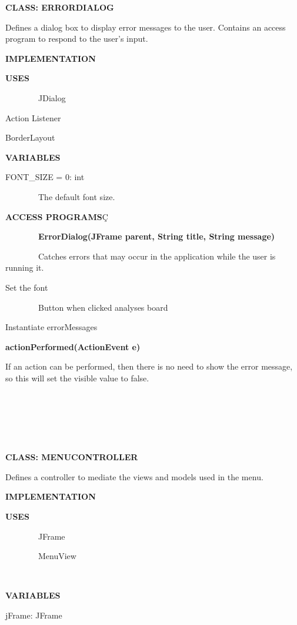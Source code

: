 \documentclass{article}
\begin{document}
{{}

{\textbf{CLASS: ERRORDIALOG }}

{Defines a dialog box to display error messages to the user. Contains an
access program to respond to the user's input.}

{}

{\textbf{IMPLEMENTATION}}

{\textbf{USES}}

{~~~~~~~~JDialog}

{Action Listener}

{BorderLayout}

{\textbf{VARIABLES}}

{FONT\_SIZE = 0: int}

{~~~~~~~~The default font size.}

{}

{\textbf{ACCESS PROGRAMS}Ç

{~~~~~~~~\textbf{ErrorDialog(JFrame parent, String title, String message)}}

{~~~~~~~~Catches errors that may occur in the application while the user
is running it. ~~~~~~~~}

{Set the font}

{~~~~~~~~Button when clicked analyses board}

{Instantiate errorMessages}

{}

{\textbf{actionPerformed(ActionEvent e)}}

{If an action can be performed, then there is no need to show the error
message, so this will set the visible value to false.}

{}

{}

{~~~~~~~~~~~~~~~~~~~~~~~~}

{~~~~~~~~}

{~~~~~~~~~~~~~~~~}

{}

{\textbf{CLASS: MENUCONTROLLER}}

{Defines a controller to mediate the views and models used in the menu.}

{\textbf{IMPLEMENTATION}}

{\textbf{USES}}

{~~~~~~~~JFrame}

{~~~~~~~~MenuView}

{~~~~~~~~}

{\textbf{VARIABLES}}

{jFrame: JFrame}

}}
\end{document}
